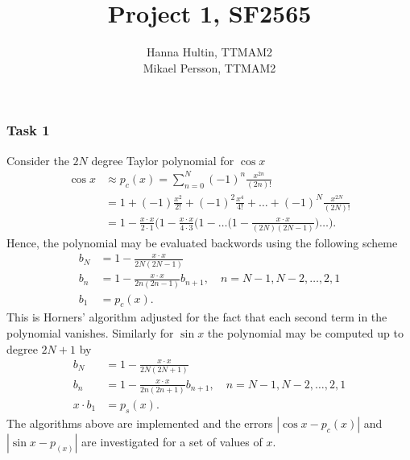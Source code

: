 \documentclass[a4paper,10pt]{article}
\title{Project 1, SF2565}
\author{Hanna Hultin, TTMAM2 \\ Mikael Persson, TTMAM2}
\begin{document}
\maketitle

\subsubsection*{Task 1}
Consider the $2N$ degree Taylor polynomial for  $\cos x$
\begin{align*}
  \cos x &\approx p_c(x) = \sum_{n=0}^{N} (-1)^n \frac{x^{2n}}{(2n)!} \\ 
  \quad &= 1 + (-1) \frac{x^2}{2!} + (-1)^2 \frac{x^4}{4!} + \dots + (-1)^N \frac{x^{2N}}{(2N)!}
  \\
  &= 1 - \frac{x\cdot x}{2\cdot 1} \Big(1 - \frac{x \cdot x}{ 4 \cdot 3} \Big( 
  1 - \dots \Big(1- \frac{x \cdot x}{(2N)(2N-1)}\Big)\dots \Big).
\end{align*}
Hence, the polynomial may be evaluated backwords using the following scheme
\begin{align*}
  b_N &= 1-\frac{x \cdot x}{2N(2N-1)} \\
  b_n &= 1-\frac{x\cdot x}{2n(2n-1)}b_{n+1},\quad n = N-1,N-2,\dots,2,1 \\
  b_1 &= p_c(x).
\end{align*}
This is Horners' algorithm adjusted for the fact that each second term in the polynomial vanishes.
Similarly for $\sin x$ the polynomial may be computed up to degree $2N+1$ by
\begin{align*}
  b_N &= 1-\frac{x \cdot x}{2N(2N+1)} \\
  b_n &= 1-\frac{x\cdot x}{2n(2n+1)}b_{n+1},\quad n = N-1,N-2,\dots,2,1 \\
  x\cdot b_1 &= p_s(x).
\end{align*}
The algorithms above are implemented and the errors 
$|\cos x - p_c(x)|$ and $|\sin x - p_(x)|$ are 
investigated for a set of values of $x$.
\end{document}
